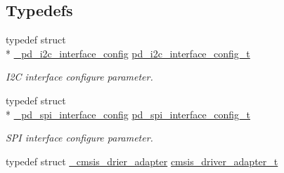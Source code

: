 \subsection*{Typedefs}
\begin{DoxyCompactItemize}
\item 
typedef struct \\*
\hyperlink{struct__pd__i2c__interface__config}{\-\_\-pd\-\_\-i2c\-\_\-interface\-\_\-config} \hyperlink{group__usb__pd__cmsis__wrapper_gada87adb00aefcd83988ef970c2f4d750}{pd\-\_\-i2c\-\_\-interface\-\_\-config\-\_\-t}
\begin{DoxyCompactList}\small\item\em I2\-C interface configure parameter. \end{DoxyCompactList}\item 
typedef struct \\*
\hyperlink{struct__pd__spi__interface__config}{\-\_\-pd\-\_\-spi\-\_\-interface\-\_\-config} \hyperlink{group__usb__pd__cmsis__wrapper_ga0a6afc9ea2599bcbe9b60e47f60d6bed}{pd\-\_\-spi\-\_\-interface\-\_\-config\-\_\-t}
\begin{DoxyCompactList}\small\item\em S\-P\-I interface configure parameter. \end{DoxyCompactList}\item 
typedef struct \hyperlink{struct__cmsis__drier__adapter}{\-\_\-cmsis\-\_\-drier\-\_\-adapter} \hyperlink{group__usb__pd__cmsis__wrapper_ga53daa69dcc6fde0029cec3452c8b58ff}{cmsis\-\_\-driver\-\_\-adapter\-\_\-t}
\end{DoxyCompactItemize}
